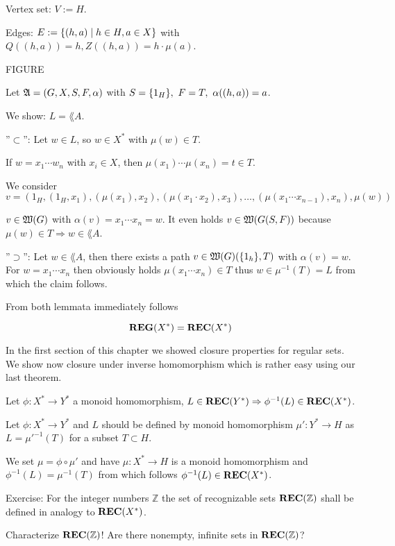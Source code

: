 Vertex set: $V := H$.

Edges: $E := \mbox{$\{(h, a) \mid h \in H, a \in X\}$}$ with $Q((h,a)) = h,
Z((h,a)) = h \cdot \mu(a)$.

FIGURE

Let $\mbox{$\mathfrak{A}$} = (G, X, S, F, \alpha)$ with $S = \mbox{$\{1_H\}$},\ F = T,\ \alpha((h,
a)) = a$.

We show: $L = \lang{A}$.

''$\subset$'': Let $w \in L$, so $w \in X^*$ with $\mu(w) \in T$.

If $w = x_1 \cdots w_n$ with $x_i \in X$, then $\mu(x_1) \cdots \mu(x_n) = t
\in T$.

We consider \[ v = (1_H, (1_H, x_1), (\mu(x_1), x_2), (\mu(x_1 \cdot x_2),
x_3), \ldots, (\mu(x_1 \cdots x_{n-1}), x_n), \mu(w)) \]

$v \in \mbox{$\mathfrak{W}(G)$}$ with $\alpha(v) = x_1 \cdots x_n = w$. It even holds $v \in
\mbox{$\mathfrak{W}(G(S, F))$}$ because $\mu(w) \in T \Rightarrow w \in \lang{A}$.

''$\supset$'': Let $w \in \lang{A}$, then there exists a path $v \in
\mbox{$\mathfrak{W}(G)$}(\mbox{$\{1_h\}$}, T)$ with $\alpha(v) = w$. For $w = x_1 \cdots x_n$
then obviously holds $\mu(x_1 \cdots x_n) \in T$ thus $w \in \mu^{-1}(T) = L$ from
which the claim follows.

From both lemmata immediately follows

\begin{theorem}
\[ \mbox{{\bf REG}}(X^*) = \mbox{{\bf REC}}(X^*) \]
\end{theorem}

In the first section of this chapter we showed closure properties for regular
sets. We show now closure under inverse homomorphism which is rather easy using
our last theorem.

\begin{theorem}
Let $\phi : X^* \to Y^*$ a monoid homomorphism, $L \in \mbox{{\bf REC}}(Y^*) \Rightarrow
\phi^{-1}(L) \in \mbox{{\bf REC}}(X^*)$.
\end{theorem}

Let $\phi : X^* \to Y^*$ and $L$ should be defined by monoid homomorphism $\mu'
: Y^* \to H$ as $L = \mu'^{-1}(T)$ for a subset $T \subset H$.

We set $\mu = \phi \circ \mu'$ and have $\mu : X^* \to H$ is a monoid
homomorphism and $\phi^{-1}(L) = \mu^{-1}(T)$ from which follows $\phi^{-1}(L)
\in \mbox{{\bf REC}}(X^*)$.

Exercise: For the integer numbers $\mathbb{Z}$ the set of recognizable sets
$\mbox{{\bf REC}}(\mathbb{Z})$ shall be defined in analogy to $\mbox{{\bf REC}}(X^*)$.

Characterize $\mbox{{\bf REC}}(\mathbb{Z})$! Are there nonempty, infinite sets in
$\mbox{{\bf REC}}(\mathbb{Z})$?
